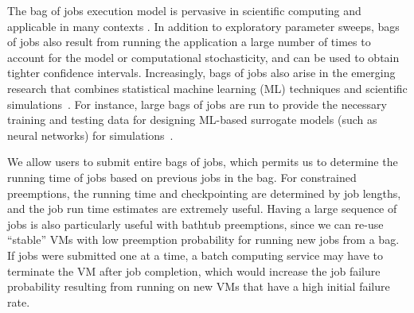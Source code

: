 The bag of jobs execution model is pervasive in scientific computing and applicable in many contexts \cite{klotsa2018intermediate,brunk2019computational,jadhao2019rheological}.
In addition to exploratory parameter sweeps, bags of jobs also result from running the application a large number of times to account for the model or computational stochasticity, and can be used to obtain tighter confidence intervals. 
Increasingly, bags of jobs also arise in the emerging research that combines statistical machine learning (ML) techniques and scientific simulations~\cite{ferguson2017machine,fox2019learning,sun2019deep,wang2019machine}. %
For instance, large bags of jobs are run to provide the necessary training and testing data for designing ML-based surrogate models (such as neural networks) for simulations~\cite{kadupitiya2019machine,kadupitiya2020machine}.

We allow users to submit entire bags of jobs, which permits us to determine the running time of jobs based on previous jobs in the bag.
For constrained preemptions, the running time and checkpointing are determined by job lengths, and the job run time estimates are extremely useful. 
Having a large sequence of jobs is also particularly useful with bathtub preemptions, since we can re-use ``stable'' VMs with low preemption probability for running new jobs from a bag.
If jobs were submitted one at a time, a batch computing service may have to terminate the VM after job completion, which would increase the job failure probability resulting from running on new VMs that have a high initial failure rate. 







